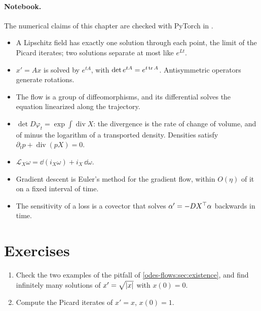 \begin{notechapter}
\paragraph{Notebook.} The numerical claims of this chapter are checked
with PyTorch in .

\begin{chaptersummary}
\begin{itemize}[nosep]
  \item A Lipschitz field has exactly one solution through each point,
        the limit of the Picard iterates; two solutions separate at
        most like $e^{Lt}$.
  \item $x' = Ax$ is solved by $e^{tA}$, with
        $\det e^{tA} = e^{t\operatorname{tr} A}$. Antisymmetric operators generate
        rotations.
  \item The flow is a group of diffeomorphisms, and its differential
        solves the equation linearized along the trajectory.
  \item $\det D\varphi_t = \exp\int\operatorname{div}X$: the
        divergence is the rate of change of volume, and of minus the
        logarithm of a transported density. Densities satisfy
        $\partial_tp + \operatorname{div}(pX) = 0$.
  \item $\mathcal L_X\omega = \dd(i_X\omega) + i_X\,\dd\omega$.
  \item Gradient descent is Euler's method for the gradient flow,
        within $O(\eta)$ of it on a fixed interval of time.
  \item The sensitivity of a loss is a covector that solves
        $\alpha' = -DX^{\top}\alpha$ backwards in time.
\end{itemize}
\end{chaptersummary}

\section*{Exercises}

\begin{exercise}\label{odes-flows:exr:1}
\begin{enumerate}[nosep]
  \item Check the two examples of the pitfall of
        \cref{odes-flows:sec:existence}, and find infinitely many
        solutions of $x' = \sqrt{\left|x\right|}$ with $x(0) = 0$.
  \item Compute the Picard iterates of $x' = x$, $x(0) = 1$.
\end{enumerate}
\end{exercise}


\end{notechapter}
